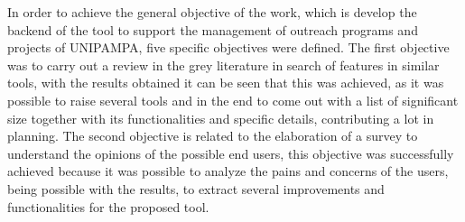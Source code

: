 
In order to achieve the general objective of the work, which is develop the backend of the tool to support the management of outreach programs and projects of \ac{UNIPAMPA}, five specific objectives were defined.
The first objective was to carry out a review in the grey literature in search of features in similar tools, with the results obtained it can be seen that this was achieved, as it was possible to raise several tools and in the end to come out with a list of significant size together with its functionalities and specific details, contributing a lot in planning.
The second objective is related to the elaboration of a survey to understand the opinions of the possible end users, this objective was successfully achieved because it was possible to analyze the pains and concerns of the users, being possible with the results, to extract several improvements and functionalities for the proposed tool.

